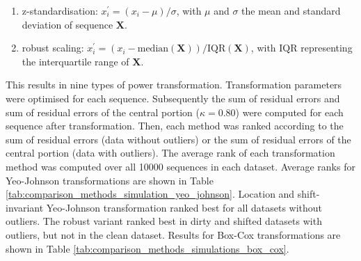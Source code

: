 \documentclass[
  a4paper,
]{article}
\begin{document}
\begin{enumerate}
\def\labelenumi{\arabic{enumi}.}
\item
  z-standardisation:
  \(x^{\prime}_{i} = \left(x_i - \mu \right) / \sigma\), with \(\mu\)
  and \(\sigma\) the mean and standard deviation of sequence
  \(\mathbf{X}\).
\item
  robust scaling:
  \(x^{\prime}_{i} = \left(x_i - \text{median}\left(\mathbf{X}\right) \right) / \text{IQR}\left(\mathbf{X}\right)\),
  with \(\text{IQR}\) representing the interquartile range of
  \(\mathbf{X}\).
\end{enumerate}

This results in nine types of power transformation. Transformation
parameters were optimised for each sequence. Subsequently the sum of
residual errors and sum of residual errors of the central portion
(\(\kappa = 0.80\)) were computed for each sequence after
transformation. Then, each method was ranked according to the sum of
residual errors (data without outliers) or the sum of residual errors of
the central portion (data with outliers). The average rank of each
transformation method was computed over all 10000 sequences in each
dataset. Average ranks for Yeo-Johnson transformations are shown in
Table \ref{tab:comparison_methods_simulation_yeo_johnson}. Location and
shift-invariant Yeo-Johnson transformation ranked best for all datasets
without outliers. The robust variant ranked best in dirty and shifted
datasets with outliers, but not in the clean dataset. Results for
Box-Cox transformations are shown in Table
\ref{tab:comparison_methods_simulations_box_cox}.
\end{document}

